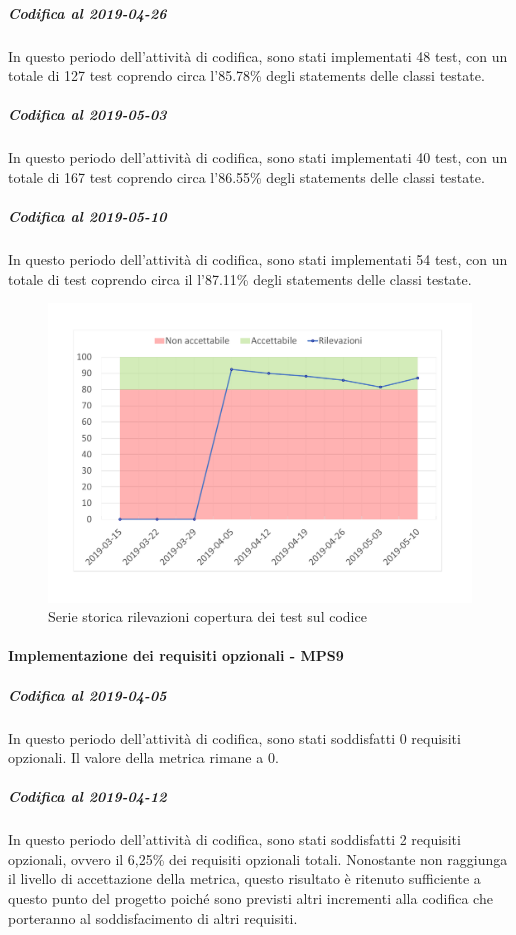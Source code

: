 \subparagraph{Codifica al 2019-04-26}
In questo periodo dell'attività di codifica, sono stati implementati 48 test, con un totale di 127 test coprendo circa l'85.78\% degli statements delle classi testate.

\subparagraph{Codifica al 2019-05-03}
In questo periodo dell'attività di codifica, sono stati implementati 40 test, con un totale di 167 test coprendo circa l'86.55\% degli statements delle classi testate.

\subparagraph{Codifica al 2019-05-10}
In questo periodo dell'attività di codifica, sono stati implementati 54 test, con un totale di  test coprendo circa il l'87.11\% degli statements delle classi testate.

\begin{figure}[H]
	\centering
	\includegraphics[scale=0.6]{images/resoconto/MPS8Chart.pdf}
	\caption{Serie storica rilevazioni copertura dei test sul codice}	
\end{figure}


\paragraph{Implementazione dei requisiti opzionali - MPS9}
\subparagraph{Codifica al 2019-04-05}
In questo periodo dell'attività di codifica, sono stati soddisfatti 0 requisiti opzionali. Il valore della metrica rimane a 0.

\subparagraph{Codifica al 2019-04-12}
In questo periodo dell'attività di codifica, sono stati soddisfatti 2 requisiti opzionali, ovvero il 6,25\% dei requisiti opzionali totali.
Nonostante non raggiunga il livello di accettazione della
metrica, questo risultato è ritenuto sufficiente a questo punto del progetto poiché sono previsti altri incrementi alla codifica che porteranno al soddisfacimento di altri requisiti.

